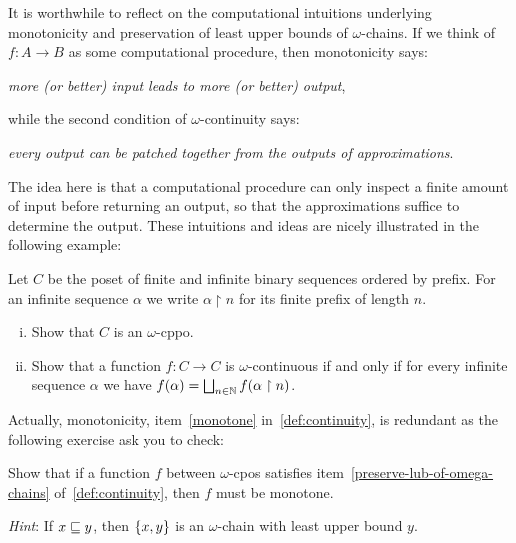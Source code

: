 It is worthwhile to reflect on the computational intuitions underlying
monotonicity and preservation of least upper bounds of \(\omega\)-chains.
%
If we think of \(f \colon A \to B\) as some computational procedure, then
monotonicity says:
\begin{displayquote}
  \emph{more (or better) input leads to more (or better) output},
\end{displayquote}
while the second condition of \(\omega\)-continuity says:
\begin{displayquote}
  \emph{every output can be patched together from the outputs of approximations}.
\end{displayquote}
The idea here is that a computational procedure can only inspect a finite amount
of input before returning an output, so that the approximations suffice to
determine the output.
%
These intuitions and ideas are nicely illustrated in the following example:
\begin{exercise}\label{exer:cantor-domain}
  Let \(C\) be the poset of finite and infinite binary sequences ordered by
  prefix. For an infinite sequence \(\alpha\) we write
  \(\alpha \upharpoonright n\) for its finite prefix of length \(n\).

  \begin{enumerate}[(i)]
  \item Show that \(C\) is an \(\omega\)-cppo.
  \item Show that a function \(f \colon C \to C\) is \(\omega\)-continuous if
    and only if for every infinite sequence \(\alpha\) we have
    \(f(\alpha) = \textstyle\bigsqcup_{n \in \mathbb N}f(\alpha \upharpoonright n)\). \qedhere
  \end{enumerate}
\end{exercise}


Actually, monotonicity, item~\ref{monotone} in~\cref{def:continuity}, is
redundant as the following exercise ask you to check:

\begin{exercise}\label{exer:monotonicity-follows}
  Show that if a function \(f\) between \(\omega\)-cpos satisfies
  item~\ref{preserve-lub-of-omega-chains} of~\cref{def:continuity}, then \(f\)
  must be monotone.

  \emph{Hint}: If \(x \sqsubseteq y\), then \(\{x,y\}\) is an \(\omega\)-chain with
  least upper bound \(y\).
\end{exercise}

